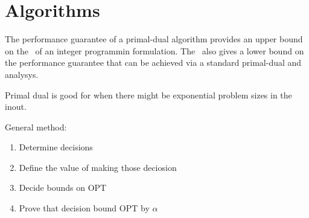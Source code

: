 \section{Algorithms}
The performance guarantee of a primal-dual algorithm provides an upper bound
on the~ of an integer programmin formulation.
The~ also gives a lower bound on the performance
guarantee that can be achieved via a standard primal-dual and analysys.

Primal dual is good for when there might be exponential problem sizes in the
inout.

General method:
\begin{enumerate}
    \item Determine decisions
    \item Define the value of making those deciosion
    \item Decide bounds on OPT
    \item Prove that decision bound OPT by $\alpha$
\end{enumerate}
